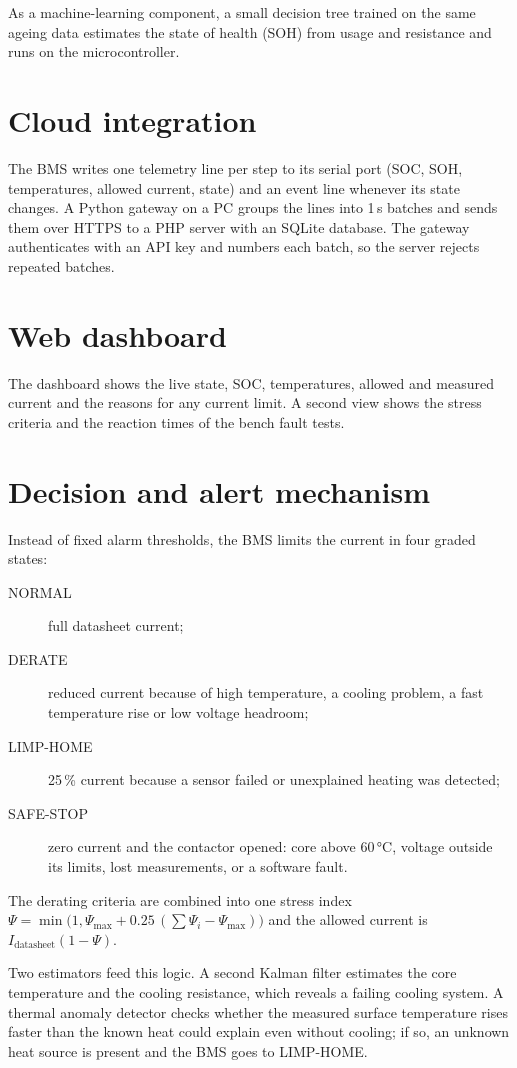As a machine-learning component, a small decision tree trained on the same ageing data estimates the state of health (SOH) from usage and resistance and runs on the microcontroller. 

\section{Cloud integration}
The BMS writes one telemetry line per step to its serial port (SOC, SOH, temperatures, allowed current, state) and an event line whenever its state changes. A Python gateway on a PC groups the lines into 1\,s batches and sends them over HTTPS to a PHP server with an SQLite database. The gateway authenticates with an API key and numbers each batch, so the server rejects repeated batches.

\section{Web dashboard}
The dashboard shows the live state, SOC, temperatures, allowed and measured current and the reasons for any current limit. A second view shows the stress criteria and the reaction times of the bench fault tests.

\section{Decision and alert mechanism}
Instead of fixed alarm thresholds, the BMS limits the current in four graded states:
\begin{description}
  \item[NORMAL] full datasheet current;
  \item[DERATE] reduced current because of high temperature, a cooling problem, a fast temperature rise or low voltage headroom;
  \item[LIMP-HOME] 25\,\% current because a sensor failed or unexplained heating was detected;
  \item[SAFE-STOP] zero current and the contactor opened: core above 60\,°C, voltage outside its limits, lost measurements, or a software fault.
\end{description}
The derating criteria are combined into one stress index $\Psi = \min\big(1, \Psi_\mathrm{max} + 0.25\,(\sum\Psi_i - \Psi_\mathrm{max})\big)$ and the allowed current is $I_\mathrm{datasheet}(1-\Psi)$.

Two estimators feed this logic. A second Kalman filter estimates the core temperature and the cooling resistance, which reveals a failing cooling system. A thermal anomaly detector checks whether the measured surface temperature rises faster than the known heat could explain even without cooling; if so, an unknown heat source is present and the BMS goes to LIMP-HOME.
